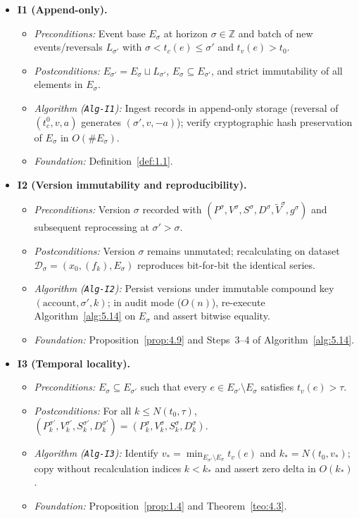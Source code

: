 \documentclass[11pt, a4paper]{article}
\theoremstyle{definition}
\theoremstyle{plain}
\theoremstyle{remark}
\begin{document}
\begin{itemize}
    \item \textbf{I1 (Append-only).}
    \begin{itemize}
        \item \emph{Preconditions:} Event base $E_\sigma$ at horizon $\sigma \in \mathbb{Z}$ and batch of new events/reversals $L_{\sigma'}$ with $\sigma < t_c(e) \le \sigma'$ and $t_v(e) > t_0$.
        \item \emph{Postconditions:} $E_{\sigma'} = E_\sigma \sqcup L_{\sigma'}$, $E_\sigma \subseteq E_{\sigma'}$, and strict immutability of all elements in $E_\sigma$.
        \item \emph{Algorithm (\texttt{Alg-I1}):} Ingest records in append-only storage (reversal of $(t_c^0, v, a)$ generates $(\sigma', v, -a)$); verify cryptographic hash preservation of $E_\sigma$ in $O(\#E_\sigma)$.
        \item \emph{Foundation:} Definition~\ref{def:1.1}.
    \end{itemize}

    \item \textbf{I2 (Version immutability and reproducibility).}
    \begin{itemize}
        \item \emph{Preconditions:} Version $\sigma$ recorded with $(P^\sigma, V^\sigma, S^\sigma, D^\sigma, \tilde{V}^\sigma, g^\sigma)$ and subsequent reprocessing at $\sigma' > \sigma$.
        \item \emph{Postconditions:} Version $\sigma$ remains unmutated; recalculating on dataset $\mathcal{D}_\sigma = (x_0, (f_k), E_\sigma)$ reproduces bit-for-bit the identical series.
        \item \emph{Algorithm (\texttt{Alg-I2}):} Persist versions under immutable compound key $(\text{account}, \sigma', k)$; in audit mode ($O(n)$), re-execute Algorithm~\ref{alg:5.14} on $E_\sigma$ and assert bitwise equality.
        \item \emph{Foundation:} Proposition~\ref{prop:4.9} and Steps~3--4 of Algorithm~\ref{alg:5.14}.
    \end{itemize}

    \item \textbf{I3 (Temporal locality).}
    \begin{itemize}
        \item \emph{Preconditions:} $E_\sigma \subseteq E_{\sigma'}$ such that every $e \in E_{\sigma'} \setminus E_\sigma$ satisfies $t_v(e) > \tau$.
        \item \emph{Postconditions:} For all $k \le N(t_0, \tau)$, $(P_k^{\sigma'}, V_k^{\sigma'}, S_k^{\sigma'}, D_k^{\sigma'}) = (P_k^\sigma, V_k^\sigma, S_k^\sigma, D_k^\sigma)$.
        \item \emph{Algorithm (\texttt{Alg-I3}):} Identify $v_* = \min_{E_{\sigma'}\setminus E_\sigma} t_v(e)$ and $k_* = N(t_0, v_*)$; copy without recalculation indices $k < k_*$ and assert zero delta in $O(k_*)$.
        \item \emph{Foundation:} Proposition~\ref{prop:1.4} and Theorem~\ref{teo:4.3}.
    \end{itemize}


\end{itemize}
\end{document}
